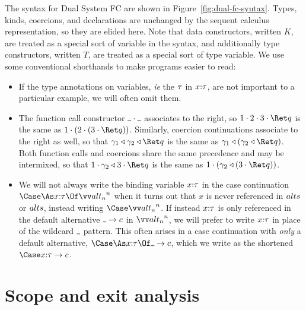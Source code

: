 \documentclass{article}
\begin{document}
The syntax for Dual System FC are shown in Figure~\ref{fig:dual-fc-syntax}.
Types, kinds, coercions, and declarations are unchanged by the sequent calculus
representation, so they are elided here.  Note that data constructors, written
$K$, are treated as a special sort of variable in the syntax, and additionally
type constructors, written $T$, are treated as a special sort of type variable.
We use some conventional shorthands to make programs easier to read:
\begin{itemize}
\item If the type annotations on variables, \emph{ie} the $\tau$ in $x{:}{\tau}$,
  are not important to a particular example, we will often omit them.

\item The function call constructor $\app{\blank}{\blank}$ associates to the
  right, so $\app{1}{\app{2}{\app{3}{\ret q}}}$ is the same as
  $\app{1}{(\app{2}{(\app{3}{\ret q})})}$.  Similarly, coercion continuations
  associate to the right as well, so that
  $\koerce{\cn_1}{\koerce{\cn_2}{\ret q}}$ is the same as
  $\koerce{\cn_1}{(\koerce{\cn_2}{\ret q})}$.  Both function calls and coercions
  share the same precedence and may be intermixed, so that
  $\app{1}{\koerce{\cn_2}{\app{3}{\ret q}}}$ is the same as
  $\app{1}{(\koerce{\cn_2}{(\app{3}{\ret q})})}$.

\item We will not always write the binding variable $x{:}{\tau}$ in the case
  continuation $\caseas{\ann x \ty}{\vect[n]{\analt_n}}$ when it turns out that
  $x$ is never referenced in $alts$ or $alts$, instead writing
  $\Case\vect[n]{\analt_n}$.  If instead $x{:}{\tau}$ is only referenced in the
  default alternative $\alt{\blank}{\cmd}$ in $\vect[n]{\analt_n}$, we will
  prefer to write $x{:}{\tau}$ in place of the wildcard $\blank$ pattern.  This
  often arises in a case continuation with \emph{only} a default alternative,
  $\caseas{\ann x \ty}{\alt{\blank}{\cmd}}$, which we write as the shortened
  $\Case\alt{\ann x \ty}{\cmd}$.
\end{itemize}

\section{Scope and exit analysis}
\label{sec:scope-analysis}
\end{document}
